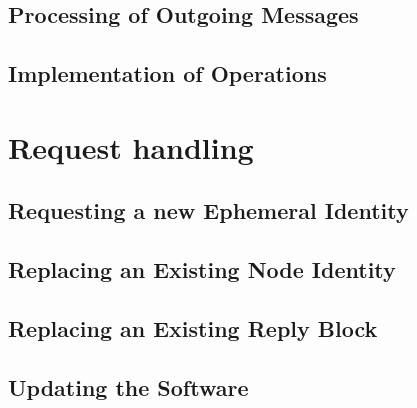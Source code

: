 \subsection{Processing of Outgoing Messages}\label{sec:processingOutgoingMessages}

\subsection{Implementation of Operations}\label{sec:implOperations}



\section{Request handling}

\subsection{Requesting a new Ephemeral Identity}\label{sec:newEID}

\subsection{Replacing an Existing Node Identity}

\subsection{Replacing an Existing Reply Block}\label{sec:replaceMURB}

\subsection{Updating the Software}
